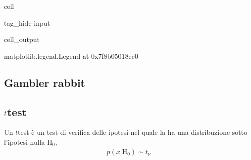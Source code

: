 \documentclass[letterpaper,10pt,italian]{jupyterBook}
\begin{document}
\begin{sphinxuseclass}{cell}
\begin{sphinxuseclass}{tag_hide-input}\begin{sphinxVerbatimOutput}

\begin{sphinxuseclass}{cell_output}
\begin{sphinxVerbatim}[commandchars=\\\{\}]
\PYGZlt{}matplotlib.legend.Legend at 0x7f8b05018ee0\PYGZgt{}
\end{sphinxVerbatim}

\noindent{}

\end{sphinxuseclass}\end{sphinxVerbatimOutput}

\end{sphinxuseclass}
\end{sphinxuseclass}
\sphinxstepscope


\subsection{Gambler rabbit}
\label{\detokenize{ch/statistics/test-fisher-rabbit:gambler-rabbit}}\label{\detokenize{ch/statistics/test-fisher-rabbit::doc}}
\sphinxstepscope


\subsection{\protect\(t\protect\)\sphinxhyphen{}test}
\label{\detokenize{ch/statistics/t-test:t-test}}\label{\detokenize{ch/statistics/t-test::doc}}


\sphinxAtStartPar
Un \(t\)\sphinxhyphen{}test è un test di verifica delle ipotesi nel quale la  ha una distribuzione  sotto l’ipotesi nulla \(\text{H}_0\),
\begin{equation*}
\begin{split}p(x|\text{H}_0) \sim t_{\nu}\end{split}
\end{equation*}
\end{document}
